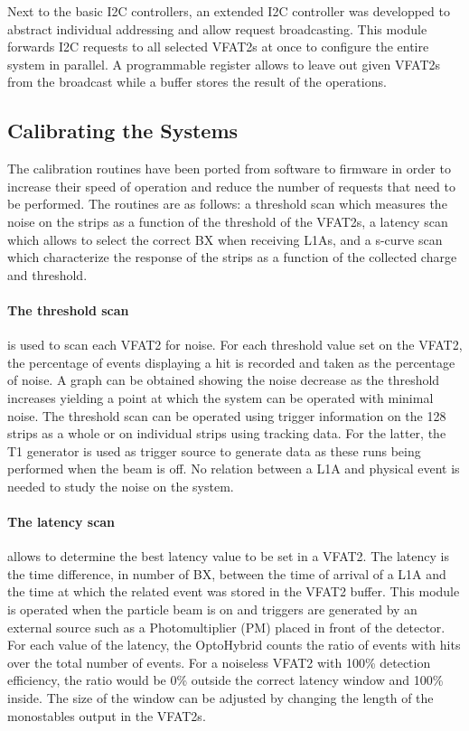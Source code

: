       Next to the basic I2C controllers, an extended I2C controller was developped to abstract individual addressing and allow request broadcasting. This module forwards I2C requests to all selected VFAT2s at once to configure the entire system in parallel. A programmable register allows to leave out given VFAT2s from the broadcast while a buffer stores the result of the operations.

    \subsection{Calibrating the Systems}

      The calibration routines have been ported from software to firmware in order to increase their speed of operation and reduce the number of requests that need to be performed. The routines are as follows: a threshold scan which measures the noise on the strips as a function of the threshold of the VFAT2s, a latency scan which allows to select the correct BX when receiving L1As, and a s-curve scan which characterize the response of the strips as a function of the collected charge and threshold. \\

      \paragraph{The threshold scan} is used to scan each VFAT2 for noise. For each threshold value set on the VFAT2, the percentage of events displaying a hit is recorded and taken as the percentage of noise. A graph can be obtained showing the noise decrease as the threshold increases yielding a point at which the system can be operated with minimal noise. The threshold scan can be operated using trigger information on the 128 strips as a whole or on individual strips using tracking data. For the latter, the T1 generator is used as trigger source to generate data as these runs being performed when the beam is off. No relation between a L1A and physical event is needed to study the noise on the system. \\

      \paragraph{The latency scan} allows to determine the best latency value to be set in a VFAT2. The latency is the time difference, in number of BX, between the time of arrival of a L1A and the time at which the related event was stored in the VFAT2 buffer. This module is operated when the particle beam is on and triggers are generated by an external source such as a Photomultiplier (PM) placed in front of the detector. For each value of the latency, the OptoHybrid counts the ratio of events with hits over the total number of events. For a noiseless VFAT2 with 100\% detection efficiency, the ratio would be 0\% outside the correct latency window and 100\% inside. The size of the window can be adjusted by changing the length of the monostables output in the VFAT2s. \\

